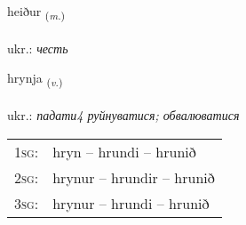 \documentclass[frontgrid, backgrid]{flacards}\usepackage[]{graphicx}\usepackage[]{xcolor}
\begin{document}
\renewcommand{\flhead}{\vskip5pt \fboxsep=0pt {\small\bfseries\footnotesize Nafnorð | іменник}}
\renewcommand{\fcfoot}{\vskip5pt \fboxsep=0pt \hspace{2pt}{\small\bfseries\footnotesize 3K}}

\renewcommand{\blhead}{\vskip5pt {\small\bfseries\footnotesize Nafnorð | іменник }}
\renewcommand{\bcfoot}{\vskip5pt \hspace{2pt}{\small\bfseries\footnotesize 3K}}


{heiður \small{\textsubscript{(\textit{m.})}} \\[1ex] %
\textphonetic{[heiːðʏr]} \\
ukr.: \emph{честь} \\  [2ex]
\renewcommand*{\arraystretch}{0.8}
}

\renewcommand{\flhead}{\vskip5pt \fboxsep=0pt {\small\bfseries\footnotesize Sagnorð | дієслово}}
\renewcommand{\fcfoot}{\vskip5pt \fboxsep=0pt \hspace{2pt}{\small\bfseries\footnotesize 3K}}

\renewcommand{\blhead}{\vskip5pt {\small\bfseries\footnotesize Sagnorð | дієслово }}
\renewcommand{\bcfoot}{\vskip5pt \hspace{2pt}{\small\bfseries\footnotesize 3K}}


{hrynja \small{\textsubscript{(\textit{v.})}} \\[1ex] %
\textphonetic{[r̥ɪnja]} \\
ukr.: \emph{падати4 руйнуватися; обвалюватися} \\  [2ex]
\renewcommand*{\arraystretch}{0.8}
\begin{tabular}{p{1cm}l}
\textsc{1sg}: & hryn -- hrundi -- hrunið \\ 
\textsc{2sg}: & hrynur -- hrundir -- hrunið \\ 
\textsc{3sg}: & hrynur -- hrundi -- hrunið \\ 
\end{tabular}
}
\end{document}
